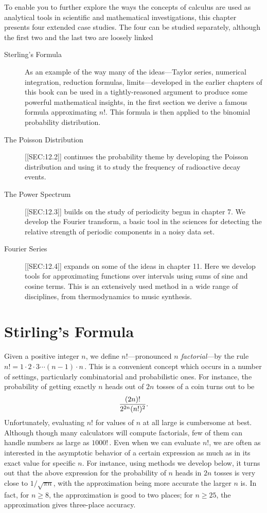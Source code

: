 {{{{To enable you to further explore the ways the concepts of calculus are used as analytical tools in scientific and mathematical investigations, this chapter presents four extended case studies.  The four can be studied separately, although the first two and the last two are loosely linked 
\begin{description}
\item[Sterling's Formula]  As an example of the way many of the ideas---Taylor series, numerical integration, reduction formulas, limits---developed in the earlier chapters of this book can be used in a tightly-reasoned argument to produce some powerful mathematical insights, in the first section we derive a famous formula approximating $n!$.  This formula is then applied to the binomial probability distribution.
\item[The Poisson Distribution] [[SEC:12.2]] continues the probability theme by developing the Poisson distribution and using it to study the frequency of radioactive decay events.  
\item[The Power Spectrum] [[SEC:12.3]] builds on the study of periodicity begun in chapter 7. We develop the Fourier transform, a basic tool in the sciences for detecting the relative strength of periodic components in a noisy data set.
\item[Fourier Series]  [[SEC:12.4]] expands on some of the ideas in chapter 11.  Here we develop tools for approximating functions over intervals using sums of sine and cosine terms.  This is an extensively used method in a wide range of disciplines, from thermodynamics to music synthesis.
\end{description} 
	



\section{Stirling's Formula}

	Given a positive integer $n$, we define $n!$---pronounced {\em $n$ factorial}---by the rule $n!=1\cdot 2\cdot 3\cdots (n-1)\cdot n$\,.  This is a convenient concept which occurs in a number of settings, 
particularly combinatorial and probabilistic ones.  For instance, the probability of getting exactly $n$ heads out of $2n$ tosses of a coin turns out to be 
	\[
{(2n)! \over 2^{2n}(n!)^2}.
\]  
Unfortunately, evaluating $n!$ for values of $n$ at all large is cumbersome at best.  Although though many calculators will compute factorials, few of them can handle numbers as large as $1000!$\,.  Even when we can evaluate $n!$, we are often as interested in the asymptotic behavior of a certain expression as much as in its exact value for specific $n$.  
For instance, using methods we develop below, it turns out that the above expression for the probability of $n$ heads in $2n$ tosses is very close to $1/\sqrt{\pi n}$, with the approximation being more accurate the larger $n$ is.  In fact, for $n \geq 8$, the approximation is good to two places; for $n \geq 25$, the approximation gives three-place accuracy.  

}}}}
